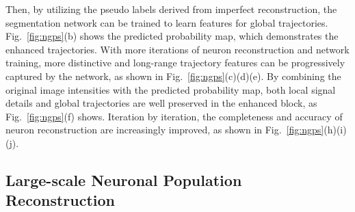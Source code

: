Then, by utilizing the pseudo labels derived from imperfect reconstruction, the segmentation network can be trained to learn features for global trajectories. Fig.~\ref{fig:ngps}(b) shows the predicted probability map, which demonstrates the enhanced trajectories.
With more iterations of neuron reconstruction and network training, more distinctive and long-range trajectory features can be progressively captured by the network, as shown in Fig.~\ref{fig:ngps}(c)(d)(e).
By combining the original image intensities with the predicted probability map, both local signal details and global trajectories are well preserved in the enhanced block, as Fig.~\ref{fig:ngps}(f) shows.
Iteration by iteration, the completeness and accuracy of neuron reconstruction are increasingly improved, as shown in Fig.~\ref{fig:ngps}(h)(i)(j).









\subsection{Large-scale Neuronal Population Reconstruction}
\label{sec:UltraNPR}

